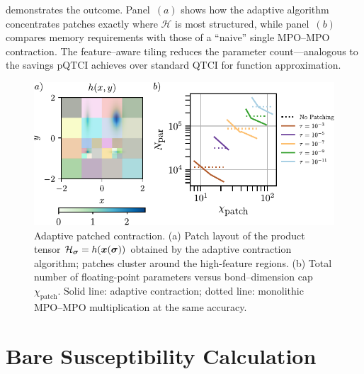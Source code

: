  demonstrates the outcome. Panel~$(a)$ shows how the adaptive algorithm concentrates patches exactly
where \(\mathcal H\) is most structured, while panel~$(b)$ compares memory requirements with those of a ``naive'' single MPO–MPO contraction.
The feature–aware tiling reduces the parameter count—analogous to the savings pQTCI achieves over standard QTCI for function approximation.
\begin{figure}[ht!]
    \centering
    \includegraphics{figures/adaptiveMulResults.pdf}
    \caption{Adaptive patched contraction.
    (a) Patch layout of the product tensor \({\mathcal H}_{\boldsymbol{\sigma}} = h(\boldsymbol{x}(\boldsymbol{\sigma}))\) obtained by the adaptive contraction algorithm; patches cluster around the high-feature regions.
    (b) Total number of floating-point parameters versus bond–dimension cap \(\chi_{\text{patch}}\). Solid line: adaptive contraction; dotted line: monolithic MPO–MPO multiplication at the same accuracy.}
    \label{fig:adaptiveMulResults}
\end{figure}




\section{Bare Susceptibility Calculation}
\label{sec:bubbleCalc}

